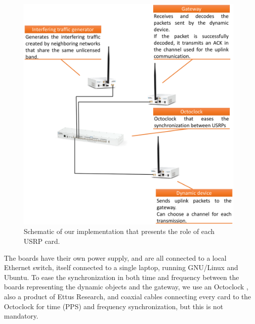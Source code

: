 \begin{figure}[!t]
    \centering
    \includegraphics[width=0.70\linewidth]{our-demo.eps}
    \caption{Schematic of our implementation that presents the role of each USRP card.}
    \label{fig:42:our_demo}
\end{figure}

The boards have their own power supply, and are all connected to a local Ethernet switch, itself connected to a single laptop, running GNU/Linux and Ubuntu.
To ease the synchronization in both time and frequency between the boards representing the dynamic objects and the gateway, we use an Octoclock \cite{OctoclockProduct}, also a product of Ettus Research,
and coaxial cables connecting every card to the Octoclock for time (PPS) and frequency synchronization, but this is not mandatory.

